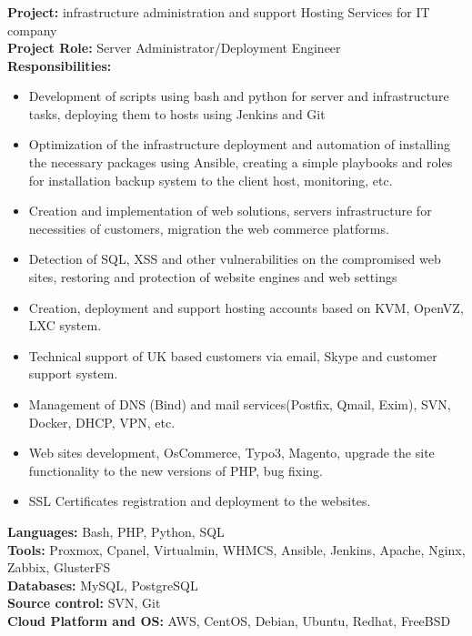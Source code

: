 \documentclass[letterpaper]{article}
\begin{document}
\subsubsection{}
\label{sec-2-1-1}
\textbf{Project:} infrastructure administration and support Hosting Services for IT company\\
\textbf{Project Role:}  Server Administrator/Deployment Engineer\\
\textbf{Responsibilities:}\\
\begin{itemize}
\item Development of scripts using bash and python for server and infrastructure tasks, deploying them to hosts using Jenkins and Git
\item Optimization of the infrastructure deployment and automation of installing the necessary packages using Ansible, creating a simple playbooks and roles for installation backup system to the client host, monitoring, etc.
\item Creation and implementation of web solutions, servers infrastructure for  necessities of customers, migration the web commerce platforms.
\item Detection of SQL, XSS and other vulnerabilities on the compromised web sites, restoring and protection of website engines and web settings
\item Creation, deployment and support hosting accounts based on KVM, OpenVZ, LXC system.
\item Technical support of UK based customers via email, Skype and customer support system.
\item Management of DNS (Bind) and mail services(Postfix, Qmail, Exim), SVN, Docker, DHCP, VPN, etc.
\item Web sites development, OsCommerce, Typo3, Magento, upgrade the site functionality to the new versions of PHP, bug fixing.
\item SSL Certificates registration and deployment to the websites.
\end{itemize}
\textbf{Languages:} Bash, PHP, Python,  SQL\\
\textbf{Tools:} Proxmox, Cpanel, Virtualmin, WHMCS, Ansible, Jenkins, Apache, Nginx, Zabbix, GlusterFS\\
\textbf{Databases:} MySQL, PostgreSQL\\
\textbf{Source control:} SVN, Git\\
\textbf{Cloud Platform and OS:} AWS, CentOS, Debian, Ubuntu, Redhat, FreeBSD\\
\end{document}
